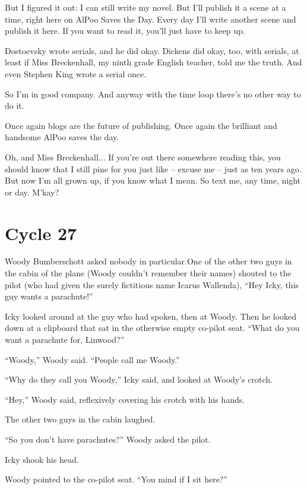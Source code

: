 But I figured it out: I can still write my novel. But I'll publish it a scene at a time, right here on AlPoo Saves the Day. Every day I'll write another scene and publish it here. If you want to read it, you'll just have to keep up.

Dostoevsky wrote serials, and he did okay. Dickens did okay, too, with serials, at least if Miss Breckenhall, my ninth grade English teacher, told me the truth. And even Stephen King wrote a serial once.

So I'm in good company. And anyway with the time loop there's no other way to do it.

Once again blogs are the future of publishing. Once again the brilliant and handsome AlPoo saves the day.

Oh, and Miss Breckenhall$\ldots$ If you're out there somewhere reading this, you should know that I still pine for you just like – excuse me – just as ten years ago. But now I'm all grown up, if you know what I mean. So text me, any time, night or day. M'kay?

\chapter{Cycle 27}
\label{cycle27}


 Woody Bumberschott asked nobody in particular.One of the other two guys in the cabin of the plane (Woody couldn't remember their names) shouted to the pilot (who had given the surely fictitious name Icarus Wallenda), ``Hey Icky, this guy wants a parachute!''

Icky looked around at the guy who had spoken, then at Woody. Then he looked down at a clipboard that sat in the otherwise empty co-pilot seat. ``What do you want a parachute for, Linwood?''

``Woody,'' Woody said. ``People call me Woody.''

``Why do they call you Woody,'' Icky said, and looked at Woody's crotch.

``Hey,'' Woody said, reflexively covering his crotch with his hands.

The other two guys in the cabin laughed.

``So you don't have parachutes?'' Woody asked the pilot.

Icky shook his head.

Woody pointed to the co-pilot seat. ``You mind if I sit here?''

